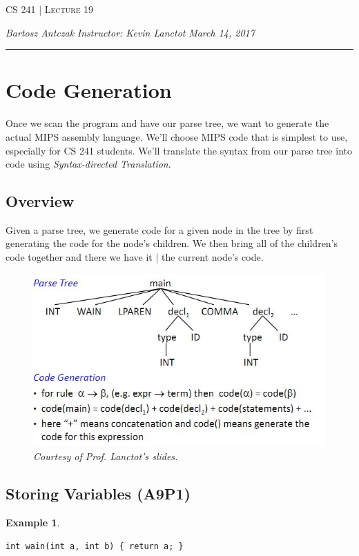 \documentclass{report}
\newcommand{\lectureNum}{19}
\newcommand{\curDate}{March 14, 2017}
\newcommand{\course}{CS 241}
\newcommand{\instructor}{Kevin Lanctot}
\newtheorem{ex}{Example}[section]
\begin{document}
\begin{center}
\begin{Large}
\textsc{\course{} | Lecture \lectureNum{}}
\end{Large}
\end{center} 
\noindent \textit{Bartosz Antczak} \hfill
\textit{Instructor: \instructor{}} \hfill
\textit{\curDate{}}
\rule{\textwidth}{0.4pt}
\section{Code Generation}
Once we scan the program and have our parse tree, we want to generate the actual MIPS assembly language. We'll choose MIPS code that is simplest to use, especially for CS 241 students. We'll translate the syntax from our parse tree into code using \textit{Syntax-directed Translation}.
\subsection{Overview}
Given a parse tree, we generate code for a given node in the tree by first generating the code for the node's children. We then bring all of the children's code together and there we have it | the current node's code.
\begin{figure}[ht]
\begin{center}
\includegraphics[scale=0.6]{code_gen.jpg}
\end{center}
\caption{\textit{Courtesy of Prof. Lanctot's slides.}}
\end{figure}
\subsection{Storing Variables (A9P1)}
\begin{ex}
\end{ex}
\noindent \texttt{int wain(int a, int b) \{ return a; \}}
\end{document}
